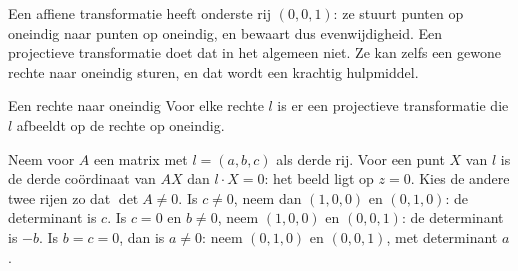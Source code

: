 Een affiene transformatie heeft onderste rij $(0, 0, 1)$: ze stuurt punten op oneindig naar punten op oneindig, en bewaart dus evenwijdigheid. Een projectieve transformatie doet dat in het algemeen niet. Ze kan zelfs een gewone rechte naar oneindig sturen, en dat wordt een krachtig hulpmiddel.

\begin{theorie}
\begin{stelling}{Een rechte naar oneindig}
Voor elke rechte $l$ is er een projectieve transformatie die $l$ afbeeldt op de rechte op oneindig.
\end{stelling}

\begin{bewijs}
Neem voor $A$ een matrix met $l = (a, b, c)$ als derde rij. Voor een punt $X$ van $l$ is de derde coördinaat van $AX$ dan $l \cdot X = 0$: het beeld ligt op $z = 0$. Kies de andere twee rijen zo dat $\det A \neq 0$. Is $c \neq 0$, neem dan $(1, 0, 0)$ en $(0, 1, 0)$: de determinant is $c$. Is $c = 0$ en $b \neq 0$, neem $(1, 0, 0)$ en $(0, 0, 1)$: de determinant is $-b$. Is $b = c = 0$, dan is $a \neq 0$: neem $(0, 1, 0)$ en $(0, 0, 1)$, met determinant $a$.
\end{bewijs}
\end{theorie}


